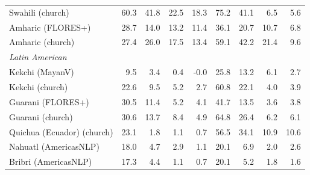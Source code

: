 \begin{table}[htbp]
\begin{tabular}{lrrrrrrrr}
Swahili (church) & 60.3 & \cellcolor{loss!58}41.8 & \cellcolor{loss!31}22.5 & \cellcolor{loss!25}18.3 & 75.2 & \cellcolor{loss!57}41.1 & \cellcolor{loss!9}6.5 & \cellcolor{loss!8}5.6 \\
Amharic (FLORES+) & 28.7 & \cellcolor{loss!19}14.0 & \cellcolor{loss!18}13.2 & \cellcolor{loss!16}11.4 & 36.1 & \cellcolor{loss!29}20.7 & \cellcolor{loss!15}10.7 & \cellcolor{loss!9}6.8 \\
Amharic (church) & 27.4 & \cellcolor{loss!36}26.0 & \cellcolor{loss!24}17.5 & \cellcolor{loss!19}13.4 & 59.1 & \cellcolor{loss!58}42.2 & \cellcolor{loss!30}21.4 & \cellcolor{loss!13}9.6 \\
\midrule \multicolumn{9}{l}{\textit{Latin American}} \\
Kekchi (MayanV) & 9.5 & \cellcolor{loss!5}3.4 & \cellcolor{loss!1}0.4 & -0.0 & 25.8 & \cellcolor{loss!18}13.2 & \cellcolor{loss!8}6.1 & \cellcolor{loss!4}2.7 \\
Kekchi (church) & 22.6 & \cellcolor{loss!13}9.5 & \cellcolor{loss!7}5.2 & \cellcolor{loss!4}2.7 & 60.8 & \cellcolor{loss!31}22.1 & \cellcolor{loss!6}4.0 & \cellcolor{loss!5}3.9 \\
Guarani (FLORES+) & 30.5 & \cellcolor{loss!16}11.4 & \cellcolor{loss!7}5.2 & \cellcolor{loss!6}4.1 & 41.7 & \cellcolor{loss!19}13.5 & \cellcolor{loss!5}3.6 & \cellcolor{loss!5}3.8 \\
Guarani (church) & 30.6 & \cellcolor{loss!19}13.7 & \cellcolor{loss!12}8.4 & \cellcolor{loss!7}4.9 & 64.8 & \cellcolor{loss!37}26.4 & \cellcolor{loss!9}6.2 & \cellcolor{loss!8}6.1 \\
Quichua (Ecuador) (church) & 23.1 & \cellcolor{loss!2}1.8 & \cellcolor{loss!1}1.1 & \cellcolor{loss!1}0.7 & 56.5 & \cellcolor{loss!47}34.1 & \cellcolor{loss!15}10.9 & \cellcolor{loss!15}10.6 \\
Nahuatl (AmericasNLP) & 18.0 & \cellcolor{loss!6}4.7 & \cellcolor{loss!4}2.9 & \cellcolor{loss!2}1.1 & 20.1 & \cellcolor{loss!10}6.9 & \cellcolor{loss!3}2.0 & \cellcolor{loss!4}2.6 \\
Bribri (AmericasNLP) & 17.3 & \cellcolor{loss!6}4.4 & \cellcolor{loss!2}1.1 & \cellcolor{loss!1}0.7 & 20.1 & \cellcolor{loss!7}5.2 & \cellcolor{loss!2}1.8 & \cellcolor{loss!2}1.6 \\
\bottomrule
\end{tabular}
\end{table}

